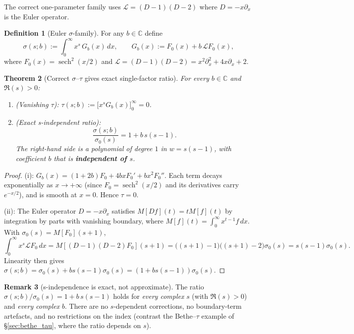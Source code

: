\documentclass[12pt]{article}
\theoremstyle{plain}
\newtheorem{theorem}{Theorem}[section]
\theoremstyle{definition}
\newtheorem{definition}[theorem]{Definition}
\newtheorem{remark}[theorem]{Remark}
\DeclareMathOperator{\sech}{sech}
\newcommand{\C}{\mathbb{C}}
\begin{document}
The correct one-parameter family uses $\mathcal{L}=(D-1)(D-2)$
where $D=-x\partial_x$ is the Euler operator.

\begin{definition}[Euler $\sigma$-family]\label{def:euler_sigma}
For any $b\in\C$ define
\begin{equation}\label{eq:euler_sigma}
  \sigma(s;b) := \int_0^\infty x^s\,G_b(x)\,dx,
  \qquad
  G_b(x) := F_0(x)+b\,\mathcal{L}F_0(x),
\end{equation}
where $F_0(x)=\sech^2(x/2)$ and $\mathcal{L}=(D-1)(D-2)=x^2\partial_x^2+4x\partial_x+2$.
\end{definition}

\begin{theorem}[Correct $\sigma$--$\tau$ gives exact single-factor ratio]\label{thm:euler_exact}
For every $b\in\C$ and $\Re(s)>0$:
\begin{enumerate}
\item[\textup{(i)}] \textup{(Vanishing $\tau$):}\quad
  $\tau(s;b):=\bigl[x^s G_b(x)\bigr]_0^\infty = 0$.
\item[\textup{(ii)}] \textup{(Exact s-independent ratio):}
  \begin{equation}\label{eq:euler_ratio}
    \frac{\sigma(s;b)}{\sigma_0(s)} = 1+b\,s(s-1).
  \end{equation}
  The right-hand side is a polynomial of degree $1$ in $w=s(s-1)$,
  with coefficient $b$ that is \textbf{independent of $s$}.
\end{enumerate}
\end{theorem}

\begin{proof}
(i): $G_b(x)=(1+2b)F_0+4bxF_0'+bx^2F_0''$.  Each term decays exponentially
as $x\to+\infty$ (since $F_0=\sech^2(x/2)$ and its derivatives carry $e^{-x/2}$),
and is smooth at $x=0$.  Hence $\tau=0$.

(ii): The Euler operator $D=-x\partial_x$ satisfies $M[Df](t)=tM[f](t)$
by integration by parts with vanishing boundary, where $M[f](t)=\int_0^\infty x^{t-1}f\,dx$.
With $\sigma_0(s)=M[F_0](s+1)$,
\[
  \int_0^\infty x^s\mathcal{L}F_0\,dx = M[(D-1)(D-2)F_0](s+1)
  = \bigl((s+1)-1\bigr)\bigl((s+1)-2\bigr)\sigma_0(s) = s(s-1)\sigma_0(s).
\]
Linearity then gives
$\sigma(s;b)=\sigma_0(s)+bs(s-1)\sigma_0(s)=(1+bs(s-1))\sigma_0(s)$.
\end{proof}

\begin{remark}[s-independence is exact, not approximate]
The ratio $\sigma(s;b)/\sigma_0(s)=1+b\,s(s-1)$ holds for \emph{every complex} $s$
(with $\Re(s)>0$) and \emph{every complex} $b$.  There are no
$s$-dependent corrections, no boundary-term artefacts, and no restrictions
on the index (contrast the Bethe--$\tau$ example of \S\ref{sec:bethe_tau},
where the ratio depends on $s$).
\end{remark}
\end{document}
